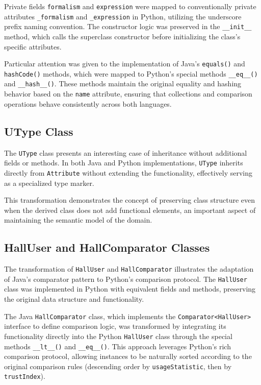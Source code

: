 \documentclass[12pt,a4paper]{article}
\begin{document}
Private fields \texttt{formalism} and \texttt{expression} were mapped to conventionally private attributes \texttt{\_formalism} and \texttt{\_expression} in Python, utilizing the underscore prefix naming convention. The constructor logic was preserved in the \texttt{\_\_init\_\_} method, which calls the superclass constructor before initializing the class's specific attributes.

Particular attention was given to the implementation of Java's \texttt{equals()} and \texttt{hashCode()} methods, which were mapped to Python's special methods \texttt{\_\_eq\_\_()} and \texttt{\_\_hash\_\_()}. These methods maintain the original equality and hashing behavior based on the \texttt{name} attribute, ensuring that collections and comparison operations behave consistently across both languages.

\subsection{UType Class}
The \texttt{UType} class presents an interesting case of inheritance without additional fields or methods. In both Java and Python implementations, \texttt{UType} inherits directly from \texttt{Attribute} without extending the functionality, effectively serving as a specialized type marker.

This transformation demonstrates the concept of preserving class structure even when the derived class does not add functional elements, an important aspect of maintaining the semantic model of the domain.

\subsection{HallUser and HallComparator Classes}
The transformation of \texttt{HallUser} and \texttt{HallComparator} illustrates the adaptation of Java's comparator pattern to Python's comparison protocol. The \texttt{HallUser} class was implemented in Python with equivalent fields and methods, preserving the original data structure and functionality.

The Java \texttt{HallComparator} class, which implements the \texttt{Comparator<HallUser>} interface to define comparison logic, was transformed by integrating its functionality directly into the Python \texttt{HallUser} class through the special methods \texttt{\_\_lt\_\_()} and \texttt{\_\_eq\_\_()}. This approach leverages Python's rich comparison protocol, allowing instances to be naturally sorted according to the original comparison rules (descending order by \texttt{usageStatistic}, then by \texttt{trustIndex}).
\end{document}
